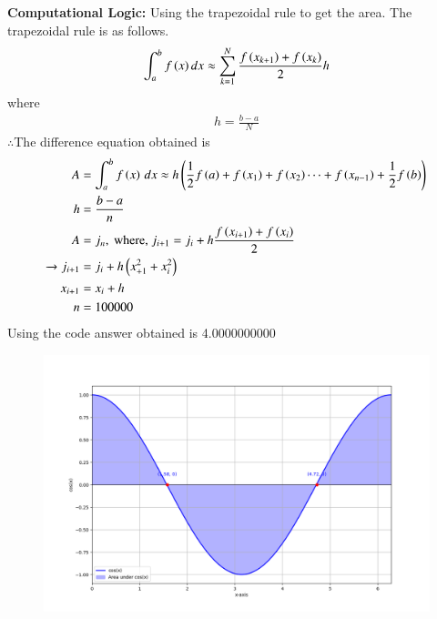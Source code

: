 \documentclass[journal]{IEEEtran}
\begin{document}
\textbf{Computational Logic:} 
Using the trapezoidal rule to get the area. The trapezoidal rule is as follows.
\begin{align}
    \int^{b}_{a} f\left(x\right)dx\approx \sum^{N}_{k=1}\frac{f\left(x_{k+1}\right)+f\left(x_{k}\right)}{2}h
\end{align}
where
\begin{align}
    h=\frac{b-a}{N}
\end{align}
$\therefore$The difference equation obtained is\\
\begin{align}
    A &= \int_a^b f\left(x\right)\, dx \approx h\left(\frac{1}{2}f\left(a\right) + f\left(x_1\right) + f\left(x_2\right) \cdots + f\left(x_{n-1}\right) + \frac{1}{2}f\left(b\right)\right)\\
    h &= \frac{b-a}{n}\\
    A &= j_n, \text{ where, } j_{i + 1} = j_i + h\frac{f\left(x_{i+1}\right) + f\left(x_i\right)}{2}\\ 
        \xrightarrow{} j_{i + 1} &= j_i + h\left({x_{+1}^2}+{x_{i}^2}\right)\\
    x_{i+1} &= x_i + h\\
    n&=100000
\end{align}
Using the code answer obtained is 4.0000000000
\begin{figure}[h]
    \centering
    \includegraphics[width=\columnwidth]{fig/figs.png}
 \end{figure}
\end{document}
